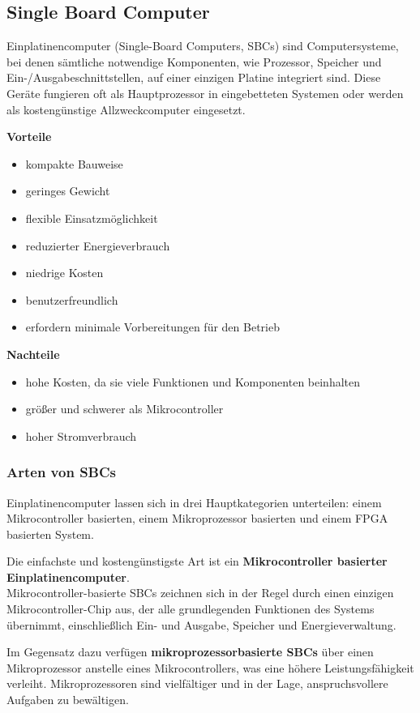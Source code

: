 \subsection{Single Board Computer}
Einplatinencomputer (Single-Board Computers, SBCs) sind Computersysteme, bei denen sämtliche notwendige Komponenten, wie Prozessor, Speicher und Ein-/Ausgabeschnittstellen, auf einer einzigen Platine integriert sind. Diese Geräte fungieren oft als Hauptprozessor in eingebetteten Systemen oder werden als kostengünstige Allzweckcomputer eingesetzt.

\textbf{Vorteile}
\begin{itemize}
	\item kompakte Bauweise
	\item geringes Gewicht
	\item flexible Einsatzmöglichkeit
	\item reduzierter Energieverbrauch 
	\item niedrige Kosten
	\item benutzerfreundlich
	\item erfordern minimale Vorbereitungen für den Betrieb
\end{itemize}

\textbf{Nachteile}
\begin{itemize}
	\item hohe Kosten, da sie viele Funktionen und Komponenten beinhalten
	\item größer und schwerer als Mikrocontroller
	\item hoher Stromverbrauch
\end{itemize}

\subsubsection{Arten von SBCs}
Einplatinencomputer lassen sich in drei Hauptkategorien unterteilen: einem Mikrocontroller basierten, einem Mikroprozessor basierten und einem FPGA basierten System. 

Die einfachste und kostengünstigste Art ist ein \textbf{Mikrocontroller basierter Einplatinencomputer}. \\ Mikrocontroller-basierte SBCs zeichnen sich in der Regel durch einen einzigen Mikrocontroller-Chip aus, der alle grundlegenden Funktionen des Systems übernimmt, einschließlich Ein- und Ausgabe, Speicher und Energieverwaltung. 

Im Gegensatz dazu verfügen \textbf{mikroprozessorbasierte SBCs} über einen Mikroprozessor anstelle eines Mikrocontrollers, was eine höhere Leistungsfähigkeit verleiht. Mikroprozessoren sind vielfältiger und in der Lage, anspruchsvollere Aufgaben zu bewältigen. 


